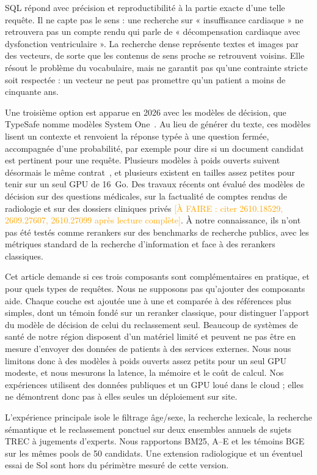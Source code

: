 \documentclass{article}
\newcommand{\todo}[1]{\textcolor{orange}{[À FAIRE : #1]}}
\begin{document}
SQL répond avec précision et reproductibilité à la partie exacte d'une telle requête. Il ne capte pas le sens : une recherche sur « insuffisance cardiaque » ne retrouvera pas un compte rendu qui parle de « décompensation cardiaque avec dysfonction ventriculaire ». La recherche dense représente textes et images par des vecteurs, de sorte que les contenus de sens proche se retrouvent voisins. Elle résout le problème du vocabulaire, mais ne garantit pas qu'une contrainte stricte soit respectée : un vecteur ne peut pas promettre qu'un patient a moins de cinquante ans.

Une troisième option est apparue en 2026 avec les modèles de décision, que TypeSafe nomme modèles System One~\citep{typesafe2026}. Au lieu de générer du texte, ces modèles lisent un contexte et renvoient la réponse typée à une question fermée, accompagnée d'une probabilité, par exemple pour dire si un document candidat est pertinent pour une requête. Plusieurs modèles à poids ouverts suivent désormais le même contrat~\citep{systemonealternatives}, et plusieurs existent en tailles assez petites pour tenir sur un seul GPU de 16~Go. Des travaux récents ont évalué des modèles de décision sur des questions médicales, sur la factualité de comptes rendus de radiologie et sur des dossiers cliniques privés \todo{citer 2610.18529, 2609.27607, 2610.27099 après lecture complète}. À notre connaissance, ils n'ont pas été testés comme rerankers sur des benchmarks de recherche publics, avec les métriques standard de la recherche d'information et face à des rerankers classiques.

Cet article demande si ces trois composants sont complémentaires en pratique, et pour quels types de requêtes. Nous ne supposons pas qu'ajouter des composants aide. Chaque couche est ajoutée une à une et comparée à des références plus simples, dont un témoin fondé sur un reranker classique, pour distinguer l'apport du modèle de décision de celui du reclassement seul. Beaucoup de systèmes de santé de notre région disposent d'un matériel limité et peuvent ne pas être en mesure d'envoyer des données de patients à des services externes. Nous nous limitons donc à des modèles à poids ouverts assez petits pour un seul GPU modeste, et nous mesurons la latence, la mémoire et le coût de calcul. Nos expériences utilisent des données publiques et un GPU loué dans le cloud ; elles ne démontrent donc pas à elles seules un déploiement sur site.

L'expérience principale isole le filtrage âge/sexe, la recherche lexicale, la recherche sémantique et le reclassement ponctuel sur deux ensembles annuels de sujets TREC à jugements d'experts. Nous rapportons BM25, A--E et les témoins BGE sur les mêmes pools de 50 candidats. Une extension radiologique et un éventuel essai de Sol sont hors du périmètre mesuré de cette version.
\end{document}
